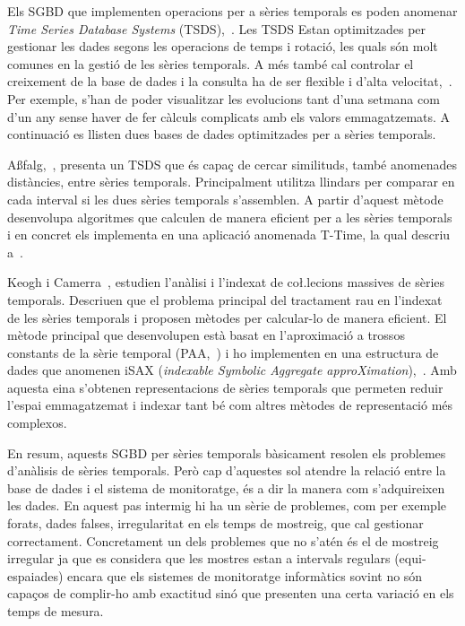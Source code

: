 Els SGBD que implementen operacions per a sèries temporals es poden anomenar \emph{Time Series Database Systems} (TSDS),~\cite{tsds}. Les TSDS Estan optimitzades per gestionar les dades segons les operacions de temps i rotació, les quals són molt comunes en la gestió de les sèries temporals.  A més també cal controlar el creixement de la base de dades i la consulta ha de ser flexible i d'alta velocitat,~\cite{keogh10:isax}. Per exemple, s'han de poder visualitzar les evolucions tant d'una setmana com d'un any sense haver de fer càlculs complicats amb els valors emmagatzemats. 
A continuació es llisten dues bases de dades optimitzades per a sèries temporals.

A{\ss}falg,~\cite{assfalg08:_advan_analy_temp}, presenta un TSDS que és capaç de
cercar similituds, també anomenades distàncies, entre sèries temporals. Principalment utilitza llindars per comparar en cada interval si les dues sèries temporals s'assemblen. A partir d'aquest mètode desenvolupa algoritmes que calculen de manera eficient per a les sèries temporals i en concret els implementa en una aplicació anomenada T-Time, la qual descriu a~\cite{assfalg08:ttime}.

Keogh i Camerra~\cite{keogh08:isax,keogh10:isax}, 
estudien l'anàlisi i l'indexat de co\l.lecions massives de sèries temporals. Descriuen que el problema principal del tractament rau en l'indexat de les sèries temporals i proposen mètodes per calcular-lo de manera eficient. El mètode principal que desenvolupen està basat en l'aproximació a trossos constants de la sèrie temporal (PAA,~\cite{keogh00}) i ho implementen en una estructura de dades que anomenen iSAX (\emph{indexable Symbolic Aggregate approXimation}),~\cite{isax}. Amb aquesta eina s'obtenen representacions de sèries temporals que permeten reduir l'espai emmagatzemat i indexar tant bé com altres mètodes de representació més complexos.




En resum, aquests SGBD per sèries temporals bàsicament resolen els problemes d'anàlisis de sèries temporals.
Però cap d'aquestes sol atendre la relació entre la base de dades i el sistema de monitoratge, és a dir la manera com s'adquireixen les dades. En aquest pas intermig hi ha un sèrie de problemes, com per exemple forats, dades falses, irregularitat en els temps de mostreig, que cal gestionar correctament. Concretament un dels problemes que no s'atén és el de mostreig irregular ja que es considera que les mostres estan a intervals regulars (equi-espaiades) encara que els sistemes de monitoratge informàtics sovint no són capaços de complir-ho amb exactitud sinó que presenten una certa variació en els temps de mesura. 

